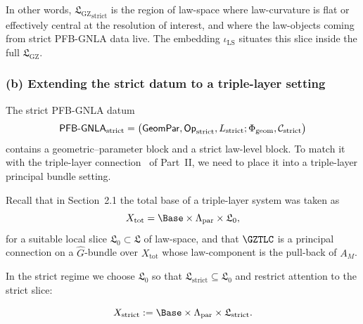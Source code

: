 \documentclass[11pt]{book}
\theoremstyle{plain}
\theoremstyle{definition}
\newcommand{\GZLS}{\ensuremath{\mathfrak{L}_{\mathrm{GZ}}}}       \newcommand{\GZLT}{\ensuremath{M_{!w}}}                           \newcommand{\GZLOC}{\ensuremath{A_M}}                             \newcommand{\GZLCurv}{\ensuremath{\mathcal{F}_{\mathrm{law}}}}
\begin{document}
In other words, ${\GZLS}_{\mathrm{strict}}$ is the region of law-space
where law-curvature is flat or effectively central at the resolution
of interest, and where the law-objects coming from strict PFB-GNLA
data live. The embedding $\iota_{\mathrm{LS}}$ situates this slice
inside the full \GZLS.



\subsubsection*{(b) Extending the strict datum to a triple-layer setting}

The strict PFB-GNLA datum
\[
   \mathsf{PFB\text- GNLA}_{\mathrm{strict}}
   =
   \bigl(
     \mathsf{GeomPar},
     \mathsf{Op}_{\mathrm{strict}},
     L_{\mathrm{strict}};
     \Phi_{\mathrm{geom}},\mathcal{C}_{\mathrm{strict}}
   \bigr)
\]
contains a geometric–parameter block and a strict law-level block.
To match it with the triple-layer connection \GZTLC\ of Part~II, we
need to place it into a triple-layer principal bundle setting.

Recall that in Section~2.1 the total base of a triple-layer system was
taken as
\[
   X_{\mathrm{tot}}
   =
   \Base\times\Lambda_{\mathrm{par}}\times\mathfrak{L}_0,
\]
for a suitable local slice $\mathfrak{L}_0\subset\mathfrak{L}$ of
law-space, and that $\GZTLC$ is a principal connection on a
$\widehat{G}$-bundle over $X_{\mathrm{tot}}$ whose law-component is the
pull-back of \GZLOC.

In the strict regime we choose $\mathfrak{L}_0$ so that
$\mathfrak{L}_{\mathrm{strict}}\subseteq\mathfrak{L}_0$ and restrict
attention to the strict slice:

\[
   X_{\mathrm{strict}}
   :=
   \Base\times\Lambda_{\mathrm{par}}\times
   \mathfrak{L}_{\mathrm{strict}}.
\]
\end{document}
